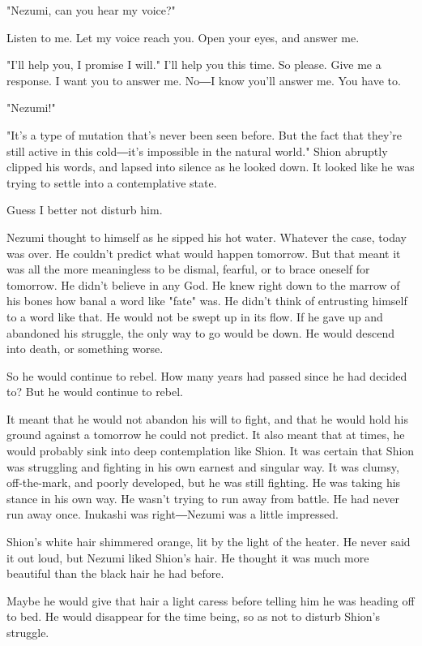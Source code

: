 "Nezumi, can you hear my voice?"

Listen to me. Let my voice reach you. Open your eyes, and answer me.

"I'll help you, I promise I will." I'll help you this time. So please.
Give me a response. I want you to answer me. No―I know you'll answer me.
You have to.

"Nezumi!"

"It's a type of mutation that's never been seen before. But the fact
that they're still active in this cold―it's impossible in the natural
world." Shion abruptly clipped his words, and lapsed into silence as he
looked down. It looked like he was trying to settle into a contemplative
state.

Guess I better not disturb him.

Nezumi thought to himself as he sipped his hot water. Whatever the case,
today was over. He couldn't predict what would happen tomorrow. But that
meant it was all the more meaningless to be dismal, fearful, or to brace
oneself for tomorrow. He didn't believe in any God. He knew right down
to the marrow of his bones how banal a word like "fate" was. He didn't
think of entrusting himself to a word like that. He would not be swept
up in its flow. If he gave up and abandoned his struggle, the only way
to go would be down. He would descend into death, or something worse.

So he would continue to rebel. How many years had passed since he had
decided to? But he would continue to rebel.

It meant that he would not abandon his will to fight, and that he would
hold his ground against a tomorrow he could not predict. It also meant
that at times, he would probably sink into deep contemplation like
Shion. It was certain that Shion was struggling and fighting in his own
earnest and singular way. It was clumsy, off-the-mark, and poorly
developed, but he was still fighting. He was taking his stance in his
own way. He wasn't trying to run away from battle. He had never run away
once. Inukashi was right―Nezumi was a little impressed.

Shion's white hair shimmered orange, lit by the light of the heater. He
never said it out loud, but Nezumi liked Shion's hair. He thought it was
much more beautiful than the black hair he had before.

Maybe he would give that hair a light caress before telling him he was
heading off to bed. He would disappear for the time being, so as not to
disturb Shion's struggle.

